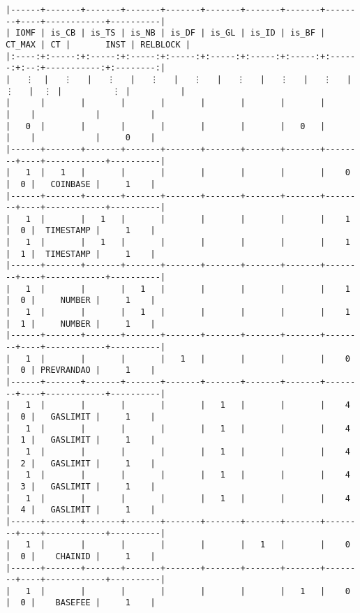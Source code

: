 \documentclass[varwidth=\maxdimen,margin=0.5cm,multi={verbatim}]{standalone}
\begin{document}
\begin{verbatim}
|------+-------+-------+-------+-------+-------+-------+-------+--------+----+------------+----------|
| IOMF | is_CB | is_TS | is_NB | is_DF | is_GL | is_ID | is_BF | CT_MAX | CT |       INST | RELBLOCK |
|:----:+:-----:+:-----:+:-----:+:-----:+:-----:+:-----:+:-----:+:------:+:--:+-----------:+:--------:|
|   ⋮  |   ⋮   |   ⋮   |   ⋮   |   ⋮   |   ⋮   |   ⋮   |   ⋮   |    ⋮   |  ⋮ |          ⋮ |          |
|      |       |       |       |       |       |       |       |        |    |            |          |
|   0  |       |       |       |       |       |       |   0   |        |    |            |     0    |
|------+-------+-------+-------+-------+-------+-------+-------+--------+----+------------+----------|
|   1  |   1   |       |       |       |       |       |       |    0   |  0 |   COINBASE |     1    |
|------+-------+-------+-------+-------+-------+-------+-------+--------+----+------------+----------|
|   1  |       |   1   |       |       |       |       |       |    1   |  0 |  TIMESTAMP |     1    |
|   1  |       |   1   |       |       |       |       |       |    1   |  1 |  TIMESTAMP |     1    |
|------+-------+-------+-------+-------+-------+-------+-------+--------+----+------------+----------|
|   1  |       |       |   1   |       |       |       |       |    1   |  0 |     NUMBER |     1    |
|   1  |       |       |   1   |       |       |       |       |    1   |  1 |     NUMBER |     1    |
|------+-------+-------+-------+-------+-------+-------+-------+--------+----+------------+----------|
|   1  |       |       |       |   1   |       |       |       |    0   |  0 | PREVRANDAO |     1    |
|------+-------+-------+-------+-------+-------+-------+-------+--------+----+------------+----------|
|   1  |       |       |       |       |   1   |       |       |    4   |  0 |   GASLIMIT |     1    |
|   1  |       |       |       |       |   1   |       |       |    4   |  1 |   GASLIMIT |     1    |
|   1  |       |       |       |       |   1   |       |       |    4   |  2 |   GASLIMIT |     1    |
|   1  |       |       |       |       |   1   |       |       |    4   |  3 |   GASLIMIT |     1    |
|   1  |       |       |       |       |   1   |       |       |    4   |  4 |   GASLIMIT |     1    |
|------+-------+-------+-------+-------+-------+-------+-------+--------+----+------------+----------|
|   1  |       |       |       |       |       |   1   |       |    0   |  0 |    CHAINID |     1    |
|------+-------+-------+-------+-------+-------+-------+-------+--------+----+------------+----------|
|   1  |       |       |       |       |       |       |   1   |    0   |  0 |    BASEFEE |     1    |

\end{verbatim}
\end{document}
